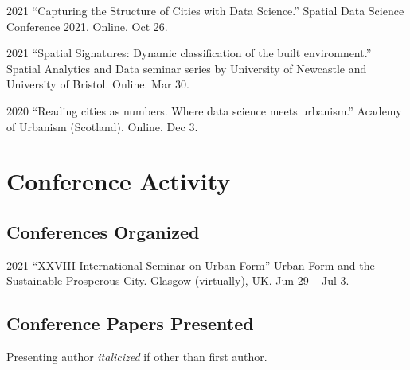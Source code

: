 \documentclass[12pt,a4paper]{report}
\begin{document}
    \begin{tablist}

        \item[2021] \tab{}\enquote{Capturing the Structure of Cities with Data Science.} Spatial Data Science Conference 2021. Online. Oct 26.

        \item[2021] \tab{}\enquote{Spatial Signatures: Dynamic classification of the built environment.} Spatial Analytics and Data seminar series by University of Newcastle and University of Bristol. Online. Mar 30.

        \item[2020] \tab{}\enquote{Reading cities as numbers. Where data science meets urbanism.} Academy of Urbanism (Scotland). Online. Dec 3.

    \end{tablist}


    \section*{Conference Activity}


    \subsection*{Conferences Organized}

    \begin{tablist}

        \item[2021] \tab{}\enquote{XXVIII International Seminar on Urban Form} Urban Form and the Sustainable Prosperous City. Glasgow (virtually), UK. Jun 29 -- Jul 3.

    \end{tablist}

    \subsection*{Conference Papers Presented}

    Presenting author \textit{italicized} if other than first author.\bigskip
\end{document}
